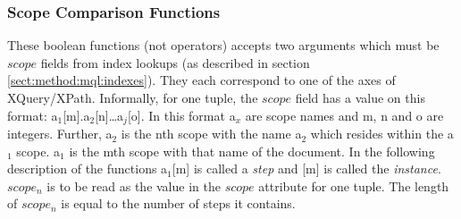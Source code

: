 \subsubsection{Scope Comparison Functions}

These boolean functions (not operators) accepts two arguments which must be $scope$ fields from index lookups (as
described in section \ref{sect:method:mql:indexes}). They each correspond to one of the axes of XQuery/XPath.
Informally, for one tuple, the $scope$ field has a value on this format:
\textsf{a}$_1$\textsf{[m].}\textsf{a}$_2$\textsf{[n]\ldots}\textsf{a}$_j$\textsf{[o]}. In this format
\textsf{a}$_x$ are scope names and \textsf{m}, \textsf{n} and \textsf{o} are integers. Further, \textsf{a}$_2$ is
the \textsf{n}th scope with the name \textsf{a}$_2$ which resides within the \textsf{a}$_1$ scope. \textsf{a}$_1$
is the \textsf{m}th scope with that name of the document. In the following description of the functions
\textsf{a}$_1$\textsf{[m]} is called a \emph{step} and \textsf{[m]} is called the \emph{instance}. $scope_n$ is to
be read as the value in the $scope$ attribute for one tuple. The length of $scope_n$ is equal to the number of
steps it contains.


